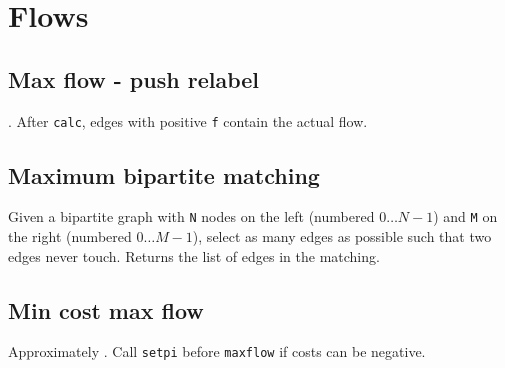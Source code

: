 \section{Flows}

\subsection{Max flow - push relabel}
. After \verb|calc|, edges with positive \verb|f| contain the actual flow.


\subsection{Maximum bipartite matching}
Given a bipartite graph with \verb|N| nodes on the left (numbered $0 \ldots N-1$) and \verb|M| on the right (numbered $0 \ldots M-1$), select as many edges as possible such that two edges never touch. Returns the list of edges in the matching.


\subsection{Min cost max flow}
Approximately . Call \texttt{setpi} before \texttt{maxflow} if costs can be negative.

